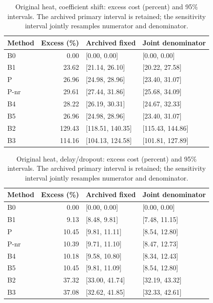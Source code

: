 \begin{table}[ht]
\caption{Original heat, coefficient shift: excess cost (percent) and 95\% intervals. The archived primary interval is retained; the sensitivity interval jointly resamples numerator and denominator.}\label{tab:joint_heat_locked_coefficient_ood}
\centering\small
\begin{tabular}{@{}lrll@{}}\toprule
Method & Excess (\%) & Archived fixed & Joint denominator\\\midrule
B0 & 0.00 & [0.00, 0.00] & [0.00, 0.00] \\
B1 & 23.62 & [21.14, 26.10] & [20.22, 27.58] \\
P & 26.96 & [24.98, 28.96] & [23.40, 31.07] \\
P-nr & 29.61 & [27.44, 31.86] & [25.68, 34.09] \\
B4 & 28.22 & [26.19, 30.31] & [24.67, 32.33] \\
B5 & 26.96 & [24.98, 28.96] & [23.40, 31.07] \\
B2 & 129.43 & [118.51, 140.35] & [115.43, 144.86] \\
B3 & 114.16 & [104.13, 124.58] & [101.81, 127.89] \\
\bottomrule\end{tabular}
\end{table}
\begin{table}[ht]
\caption{Original heat, delay/dropout: excess cost (percent) and 95\% intervals. The archived primary interval is retained; the sensitivity interval jointly resamples numerator and denominator.}\label{tab:joint_heat_locked_delay_dropout}
\centering\small
\begin{tabular}{@{}lrll@{}}\toprule
Method & Excess (\%) & Archived fixed & Joint denominator\\\midrule
B0 & 0.00 & [0.00, 0.00] & [0.00, 0.00] \\
B1 & 9.13 & [8.48, 9.81] & [7.48, 11.15] \\
P & 10.45 & [9.81, 11.11] & [8.54, 12.80] \\
P-nr & 10.39 & [9.71, 11.10] & [8.47, 12.73] \\
B4 & 10.18 & [9.58, 10.80] & [8.34, 12.43] \\
B5 & 10.45 & [9.81, 11.09] & [8.54, 12.80] \\
B2 & 37.32 & [33.00, 41.74] & [32.19, 43.32] \\
B3 & 37.08 & [32.62, 41.85] & [32.33, 42.61] \\
\bottomrule\end{tabular}
\end{table}
